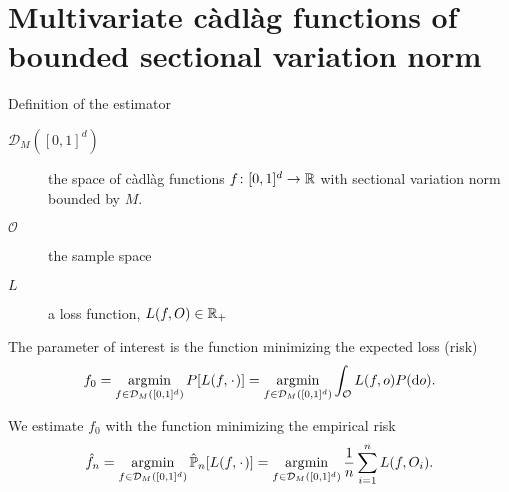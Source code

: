 \documentclass[smaller]{beamer}\usepackage{listings}
\begin{document}
\section{Multivariate càdlàg functions of bounded sectional variation norm}
\label{sec:org93b0141}
\begin{frame}[label={sec:org362c577}]{Definition of the estimator}
\small

\begin{description}
\item[{\(\mathcal{D}_M([0,1]^d)\)}] the space of \color{blue}càdlàg \color{black}
functions \(f \colon [0,1]^d \rightarrow \mathbb{R}\) with \color{blue}sectional
variation norm \color{black} bounded by \(M\).
\item[{\(\mathcal{O}\)}] the sample space
\item[{\(L\)}] a loss function, \(L(f, O) \in \mathbb{R}_+\)
\end{description}

\vfill 

The parameter of interest is the function minimizing the expected loss (risk)
\begin{equation*}
  f_0 = \argmin_{f\in \mathcal{D}_M([0,1]^d)} P[L(f, \blank)]
  = \argmin_{f\in \mathcal{D}_M([0,1]^d)} \int_{\mathcal{O}} L(f, o)  P (\diff o).
\end{equation*}

\vfill 

We estimate \(f_0\) with the function minimizing the empirical risk
\begin{equation*}
  \hat{f}_n
  = \argmin_{f\in \mathcal{D}_M([0,1]^d)} \empmeas[L(f, \blank)]
  = \argmin_{f\in \mathcal{D}_M([0,1]^d)} \frac{1}{n}\sum_{i=1}^{n}L(f,O_i).
\end{equation*}
\end{frame}
\end{document}
